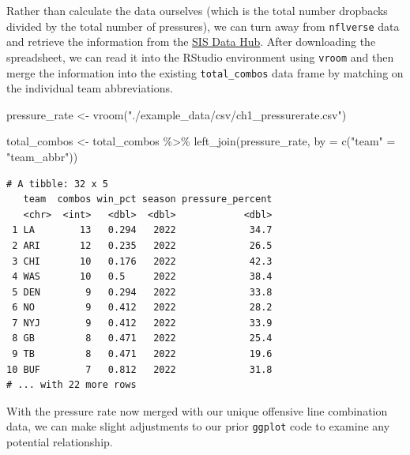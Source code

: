 \documentclass[
  letterpaper,
]{krantz}
\newenvironment{Shaded}{\begin{snugshade}}{\end{snugshade}}
\newcommand{\AttributeTok}[1]{\textcolor[rgb]{0.40,0.45,0.13}{#1}}
\newcommand{\FunctionTok}[1]{\textcolor[rgb]{0.28,0.35,0.67}{#1}}
\newcommand{\NormalTok}[1]{\textcolor[rgb]{0.00,0.23,0.31}{#1}}
\newcommand{\OtherTok}[1]{\textcolor[rgb]{0.00,0.23,0.31}{#1}}
\newcommand{\SpecialCharTok}[1]{\textcolor[rgb]{0.37,0.37,0.37}{#1}}
\newcommand{\StringTok}[1]{\textcolor[rgb]{0.13,0.47,0.30}{#1}}
\begin{document}
Rather than calculate the data ourselves (which is the total number
dropbacks divided by the total number of pressures), we can turn away
from \texttt{nflverse} data and retrieve the information from the
\href{https://pro.sisdatahub.com/}{SIS Data Hub}. After downloading the
spreadsheet, we can read it into the RStudio environment using
\texttt{vroom} and then merge the information into the existing
\texttt{total\_combos} data frame by matching on the individual team
abbreviations.

\begin{Shaded}
\begin{Highlighting}[]
\NormalTok{pressure\_rate }\OtherTok{\textless{}{-}} \FunctionTok{vroom}\NormalTok{(}\StringTok{"./example\_data/csv/ch1\_pressurerate.csv"}\NormalTok{)}

\NormalTok{total\_combos }\OtherTok{\textless{}{-}}\NormalTok{ total\_combos }\SpecialCharTok{\%\textgreater{}\%}
  \FunctionTok{left\_join}\NormalTok{(pressure\_rate, }\AttributeTok{by =} \FunctionTok{c}\NormalTok{(}\StringTok{"team"} \OtherTok{=} \StringTok{"team\_abbr"}\NormalTok{))}
\end{Highlighting}
\end{Shaded}

\begin{verbatim}
# A tibble: 32 x 5
   team  combos win_pct season pressure_percent
   <chr>  <int>   <dbl>  <dbl>            <dbl>
 1 LA        13   0.294   2022             34.7
 2 ARI       12   0.235   2022             26.5
 3 CHI       10   0.176   2022             42.3
 4 WAS       10   0.5     2022             38.4
 5 DEN        9   0.294   2022             33.8
 6 NO         9   0.412   2022             28.2
 7 NYJ        9   0.412   2022             33.9
 8 GB         8   0.471   2022             25.4
 9 TB         8   0.471   2022             19.6
10 BUF        7   0.812   2022             31.8
# ... with 22 more rows
\end{verbatim}

With the pressure rate now merged with our unique offensive line
combination data, we can make slight adjustments to our prior
\texttt{ggplot} code to examine any potential relationship.
\end{document}
